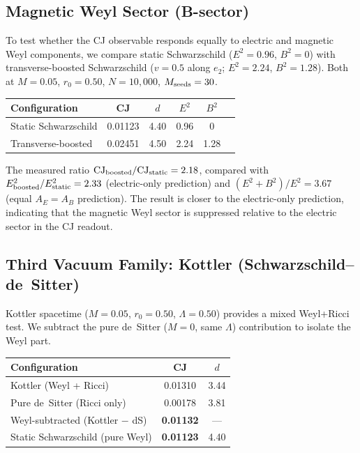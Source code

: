 \documentclass[12pt,a4paper]{article}
\begin{document}
\subsection{Magnetic Weyl Sector (B-sector)}

To test whether the CJ observable responds equally to electric and magnetic Weyl components, we compare static Schwarzschild ($E^2 = 0.96$, $B^2 = 0$) with transverse-boosted Schwarzschild ($v = 0.5$ along $e_2$; $E^2 = 2.24$, $B^2 = 1.28$). Both at $M = 0.05$, $r_0 = 0.50$, $N = 10{,}000$, $M_{\rm seeds} = 30$.

\begin{center}
\begin{tabular}{lccccc}
\toprule
Configuration & CJ & $d$ & $E^2$ & $B^2$ \\
\midrule
Static Schwarzschild & 0.01123 & 4.40 & 0.96 & 0 \\
Transverse-boosted & 0.02451 & 4.50 & 2.24 & 1.28 \\
\bottomrule
\end{tabular}
\end{center}

\noindent The measured ratio $\mathrm{CJ}_{\rm boosted}/\mathrm{CJ}_{\rm static} = 2.18$, compared with $E^2_{\rm boosted}/E^2_{\rm static} = 2.33$ (electric-only prediction) and $(E^2 + B^2)/E^2 = 3.67$ (equal $A_E = A_B$ prediction). The result is closer to the electric-only prediction, indicating that the magnetic Weyl sector is suppressed relative to the electric sector in the CJ readout.

\subsection{Third Vacuum Family: Kottler (Schwarzschild--de~Sitter)}

Kottler spacetime ($M = 0.05$, $r_0 = 0.50$, $\Lambda = 0.50$) provides a mixed Weyl+Ricci test. We subtract the pure de~Sitter ($M = 0$, same $\Lambda$) contribution to isolate the Weyl part.

\begin{center}
\begin{tabular}{lcc}
\toprule
Configuration & CJ & $d$ \\
\midrule
Kottler (Weyl + Ricci) & 0.01310 & 3.44 \\
Pure de~Sitter (Ricci only) & 0.00178 & 3.81 \\
Weyl-subtracted (Kottler $-$ dS) & \textbf{0.01132} & --- \\
Static Schwarzschild (pure Weyl) & \textbf{0.01123} & 4.40 \\
\bottomrule
\end{tabular}
\end{center}
\end{document}
